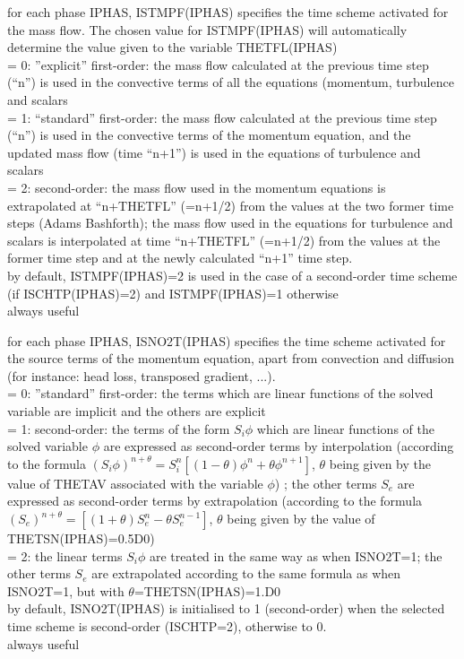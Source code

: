 {for each phase IPHAS, ISTMPF(IPHAS) specifies the time scheme activated
for the mass flow. The chosen value for ISTMPF(IPHAS) will automatically
determine the value given to the variable THETFL(IPHAS)\\
\hspace*{1.3cm}= 0: ''explicit'' first-order: the mass flow calculated
at the previous time step (``n'') is used in the convective terms of all
the equations (momentum, turbulence and scalars\\ 
\hspace*{1.3cm}= 1: ``standard'' first-order: the mass flow calculated
at the previous time step (``n'') is used in the convective terms of the
momentum equation, and the updated mass flow (time ``n+1'') is used in the
equations of turbulence and scalars\\  
\hspace*{1.3cm}= 2: second-order: the mass flow used in the momentum equations
is extrapolated at ``n+THETFL'' (=n+1/2) from the values at the two former time
steps (Adams Bashforth); the mass flow used in the equations for turbulence and
scalars is interpolated at time ``n+THETFL'' (=n+1/2) from the values at the
former time step and at the newly calculated ``n+1'' time step.\\
by default, ISTMPF(IPHAS)=2 is used in the case of a second-order time
scheme (if ISCHTP(IPHAS)=2) and ISTMPF(IPHAS)=1 otherwise\\
always useful}

{for each phase IPHAS, ISNO2T(IPHAS) specifies the time scheme activated
for the source terms of the momentum equation, apart from convection and
diffusion (for instance: head loss, transposed gradient, ...).\\
\hspace*{1.3cm}= 0: ''standard'' first-order: the terms which are linear
functions of the solved variable are implicit and the others are explicit\\
\hspace*{1.3cm}= 1: second-order: the terms of the form $S_i\phi$ which are
linear functions of the solved variable 
$\phi$ are expressed as second-order terms by interpolation (according
to the formula
$(S_i\phi)^{n+\theta}=S_i^n[(1-\theta)\phi^n+\theta\phi^{n+1}]$, $\theta$
being given by the value of THETAV associated with the variable $\phi$)
; the other terms $S_e$ are expressed as second-order terms by
extrapolation (according to the formula
$(S_e)^{n+\theta}=[(1+\theta)S_e^n-\theta S_e^{n-1}]$, $\theta$ being
given by the value of THETSN(IPHAS)=0.5D0)\\ 
\hspace*{1.3cm}= 2: the linear terms $S_i\phi$ are treated in the same
way as when ISNO2T=1;
the other terms $S_e$ are extrapolated according to the same formula
as when ISNO2T=1, but with $\theta$=THETSN(IPHAS)=1.D0\\
by default, ISNO2T(IPHAS) is initialised to 1 (second-order) when the selected
time scheme is second-order (ISCHTP=2), otherwise to 0.\\
always useful}


